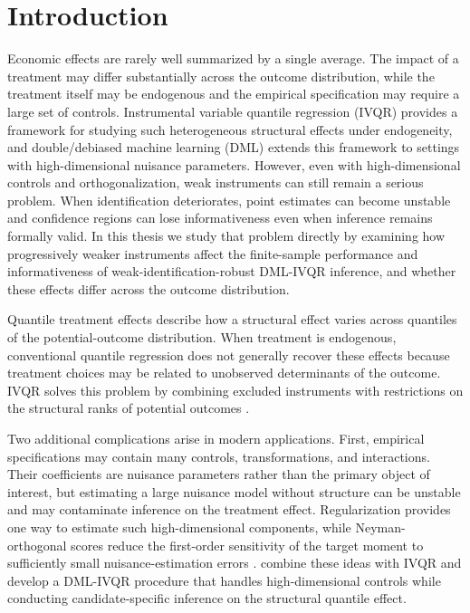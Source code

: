 \section{Introduction}
\makeatletter
\@afterindenttrue
\makeatother

Economic effects are rarely well summarized by a single average. The impact of a treatment may differ substantially across the outcome distribution, while the treatment itself may be endogenous and the empirical specification may require a large set of controls. Instrumental variable quantile regression (IVQR) provides a framework for studying such heterogeneous structural effects under endogeneity, and double/debiased machine learning (DML) extends this framework to settings with high-dimensional nuisance parameters. However, even with high-dimensional controls and orthogonalization, weak instruments can still remain a serious problem. When identification deteriorates, point estimates can become unstable and confidence regions can lose informativeness even when inference remains formally valid. In this thesis we study that problem directly by examining how progressively weaker instruments affect the finite-sample performance and informativeness of weak-identification-robust DML-IVQR inference, and whether these effects differ across the outcome distribution.

Quantile treatment effects describe how a structural effect varies across quantiles of the potential-outcome distribution. When treatment is endogenous, conventional quantile regression does not generally recover these effects because treatment choices may be related to unobserved determinants of the outcome. IVQR solves this problem by combining excluded instruments with restrictions on the structural ranks of potential outcomes \parencite{chernozhukov_hansen_2005}.

Two additional complications arise in modern applications. First, empirical specifications may contain many controls, transformations, and interactions. Their coefficients are nuisance parameters rather than the primary object of interest, but estimating a large nuisance model without structure can be unstable and may contaminate inference on the treatment effect. Regularization provides one way to estimate such high-dimensional components, while Neyman-orthogonal scores reduce the first-order sensitivity of the target moment to sufficiently small nuisance-estimation errors \parencite{chernozhukov_et_al_2018}. \textcite{chen_huang_tien_2021} combine these ideas with IVQR and develop a DML-IVQR procedure that handles high-dimensional controls while conducting candidate-specific inference on the structural quantile effect.

